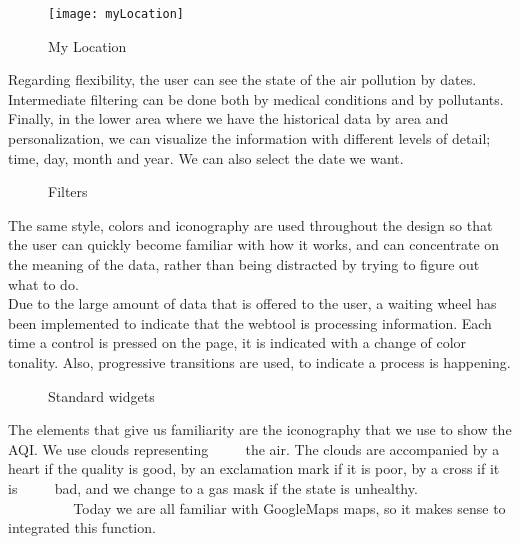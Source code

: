 \begin{figure}[ht]
    \centering
    \texttt{[image: myLocation]}
    \caption{My Location}
\end{figure}

Regarding flexibility, the user can see the state of the air pollution by dates. Intermediate filtering can be done both by medical conditions and by pollutants. Finally, in the lower area where we have
the historical data by area and personalization, we can visualize the information with different levels of detail; time, day, month and year. We can also
select the date we want.\\

\begin{figure}[ht]
    \centering
    \hfill
    \vfill
  
  \caption{Filters}
    \end{figure}
    The same style, colors and iconography are used throughout the design so that the user can quickly become familiar with how it works, and can
    concentrate on the meaning of the data, rather than being distracted by trying to figure out what to do.\\
    
    Due to the large amount of data that is offered to the user, a waiting wheel has been implemented to indicate
    that the webtool is processing information. Each time a control is pressed on the page, it is indicated with a change
    of color tonality. Also, progressive transitions are used, to indicate a process is happening.

    
    \begin{figure}[ht]
        \centering
        \hfill
        \vfill
         \hfill
      
      \caption{Standard widgets}
        \end{figure}

        The elements that give us familiarity are the iconography that we use to show the AQI. We use clouds representing
             the air. The clouds are accompanied by a heart if the quality is good, by an exclamation mark if it is poor, by a cross if it is
             bad, and we change to a gas mask if the state is unhealthy.\\
            
             Today we are all familiar with GoogleMaps maps, so it makes sense to integrated this function.      

